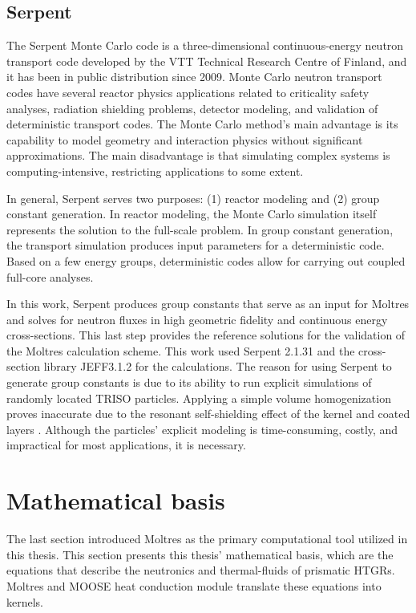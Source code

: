 \subsection{Serpent}
\label{sec:ch3-serpent}

The Serpent Monte Carlo code is a three-dimensional continuous-energy neutron transport code developed by the VTT Technical Research Centre of Finland, and it has been in public distribution since 2009.
Monte Carlo neutron transport codes have several reactor physics applications related to criticality safety analyses, radiation shielding problems, detector modeling, and validation of deterministic transport codes.
The Monte Carlo method's main advantage is its capability to model geometry and interaction physics without significant approximations.
The main disadvantage is that simulating complex systems is computing-intensive, restricting applications to some extent.

In general, Serpent serves two purposes: (1) reactor modeling and (2) group constant generation.
In reactor modeling, the Monte Carlo simulation itself represents the solution to the full-scale problem.
In group constant generation, the transport simulation produces input parameters for a deterministic code.
Based on a few energy groups, deterministic codes allow for carrying out coupled full-core analyses.

In this work, Serpent produces group constants that serve as an input for Moltres and solves for neutron fluxes in high geometric fidelity and continuous energy cross-sections.
This last step provides the reference solutions for the validation of the Moltres calculation scheme.
This work used Serpent 2.1.31 and the cross-section library JEFF3.1.2 for the calculations.
The reason for using Serpent to generate group constants is due to its ability to run explicit simulations of randomly located TRISO particles.
Applying a simple volume homogenization proves inaccurate due to the resonant self-shielding effect of the kernel and coated layers \cite{strydom_results_2015}.
Although the particles' explicit modeling is time-consuming, costly, and impractical for most applications, it is necessary.

\section{Mathematical basis}
\label{sec:ch3-math}

The last section introduced Moltres as the primary computational tool utilized in this thesis.
This section presents this thesis' mathematical basis, which are the equations that describe the neutronics and thermal-fluids of prismatic HTGRs.
Moltres and MOOSE heat conduction module translate these equations into kernels.

